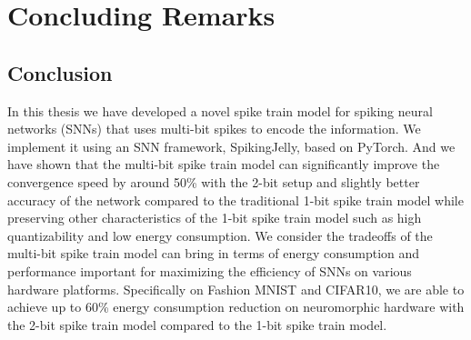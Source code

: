 \chapter{Concluding Remarks}
\label{chap:concluding_remarks}

    \section{Conclusion}
    \label{sec:conclusion}
        In this thesis we have developed a novel spike train model for spiking neural networks (SNNs) that uses multi-bit spikes to encode the information. We implement it using an SNN framework, SpikingJelly, based on PyTorch. And we have shown that the multi-bit spike train model can significantly improve the convergence speed by around 50\% with the 2-bit setup and slightly better accuracy of the network compared to the traditional 1-bit spike train model while preserving other characteristics of the 1-bit spike train model such as high quantizability and low energy consumption. We consider the tradeoffs of  the multi-bit spike train model can bring in terms of energy consumption and performance important for maximizing the efficiency of SNNs on various hardware platforms. Specifically on Fashion MNIST and CIFAR10, we are able to achieve up to 60\% energy consumption reduction on neuromorphic hardware with the 2-bit spike train model compared to the 1-bit spike train model. 

